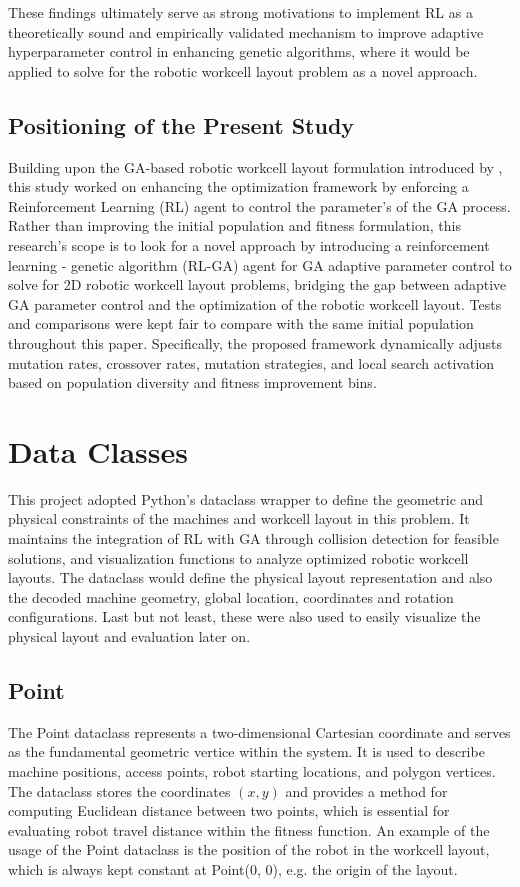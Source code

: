 \documentclass{article}
\begin{document}
These findings ultimately serve as strong motivations to implement RL as a theoretically sound and empirically validated mechanism to improve adaptive hyperparameter control in enhancing genetic algorithms, where it would be applied to solve for the robotic workcell layout problem as a novel approach.

\subsection{Positioning of the Present Study}

Building upon the GA-based robotic workcell layout formulation introduced by \textcite{sim2005rwl}, this study worked on enhancing the optimization framework by enforcing a Reinforcement Learning (RL) agent to control the parameter's of the GA process. Rather than improving the initial population and fitness formulation, this research's scope is to look for a novel approach by introducing a reinforcement learning - genetic algorithm (RL-GA) agent for GA adaptive parameter control to solve for 2D robotic workcell layout problems, bridging the gap between adaptive GA parameter control and the optimization of the robotic workcell layout. Tests and comparisons were kept fair to compare with the same initial population throughout this paper. Specifically, the proposed framework dynamically adjusts mutation rates, crossover rates, mutation strategies, and local search activation based on population diversity and fitness improvement bins. 

\newpage
\section{Data Classes}
This project adopted Python’s dataclass wrapper to define the geometric and physical constraints of the machines and workcell layout in this problem. It maintains the integration of RL with GA through collision detection for feasible solutions, and visualization functions to analyze optimized robotic workcell layouts.  The dataclass would define the physical layout representation and also the decoded machine geometry, global location, coordinates and rotation configurations. Last but not least, these were also used to easily visualize the physical layout and evaluation later on.

\subsection{Point}
The Point dataclass represents a two-dimensional Cartesian coordinate and serves as the fundamental geometric vertice within the system. It is used to describe machine positions, access points, robot starting locations, and polygon vertices. The dataclass stores the coordinates $(x, y)$ and provides a method for computing Euclidean distance between two points, which is essential for evaluating robot travel distance within the fitness function. An example of the usage of the Point dataclass is the position of the robot in the workcell layout, which is always kept constant at Point(0, 0), e.g. the origin of the layout.
\end{document}
